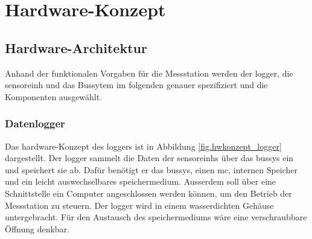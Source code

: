 %
%

\chapter{Hardware-Konzept}\label{chap.hardware}



\section{Hardware-Architektur}\label{sec.hw_arch}

Anhand der funktionalen Vorgaben für die Messstation werden der \gls{logger}, die \gls{sensoreinh} und das Bussytem im folgenden genauer spezifiziert und die Komponenten ausgewählt.

\subsection{Datenlogger}
Das \gls{hardware}-Konzept des \gls{logger}s ist in Abbildung \ref{fig.hwkonzept_logger} dargestellt.
Der \gls{logger} sammelt die Daten der \glspl{sensoreinh} über das \gls{bussys} ein und speichert sie ab. Dafür benötigt er das \gls{bussys}, einen \gls{mc}, internen Speicher und ein leicht auswechselbares \gls{speichermedium}. Ausserdem soll über eine Schnittstelle ein Computer angeschlossen werden können, um den Betrieb der Messstation zu steuern. Der \gls{logger} wird in einem wasserdichten Gehäuse untergebracht. Für den Austausch des \gls{speichermedium}s wäre eine verschraubbare Öffnung denkbar.

